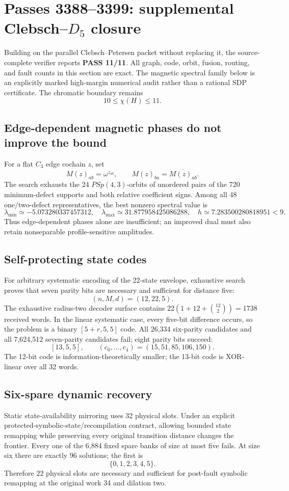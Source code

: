 \section{Passes 3388--3399: supplemental Clebsch--\(D_5\) closure}
\label{sec:bt3388-3399-clebsch-d5}

Building on the parallel Clebsch--Petersen packet without replacing it, the source-complete verifier reports \textbf{PASS 11/11}.  All graph, code,
orbit, fusion, routing, and fault counts in this section are exact.  The magnetic
spectral family below is an explicitly marked high-margin numerical audit rather
than a rational SDP certificate.  The chromatic boundary remains
\[
  \boxed{10\leq\chi(H)\leq 11}.
\]

\subsection{Edge-dependent magnetic phases do not improve the bound}
For a flat \(C_3\) edge cochain \(z\), set
\[
 M(z)_{ab}=\omega^{z_{ab}},\qquad M(z)_{ba}=\overline{M(z)_{ab}}.
\]
The search exhausts the 24 \(PSp(4,3)\)-orbits of unordered pairs of the
720 minimum-defect supports and both relative coefficient signs.  Among all
48 one/two-defect representatives, the best nonzero spectral value is
\[
 \lambda_{\min}\simeq-5.073280337457312,
 \quad \lambda_{\max}\simeq31.877958425086288,
 \quad h\simeq7.283500280818951<9.
\]
Thus edge-dependent phases alone are insufficient; an improved dual must also
retain nonseparable profile-sensitive amplitudes.

\subsection{Self-protecting state codes}
For arbitrary systematic encoding of the 22-state envelope, exhaustive search
proves that seven parity bits are necessary and sufficient for distance five:
\[
 \boxed{(n,M,d)=(12,22,5)}.
\]
The exhaustive radius-two decoder surface contains
\(22(1+12+\binom{12}{2})=1738\) received words.  In the linear systematic
case, every five-bit difference occurs, so the problem is a binary
\([5+r,5,5]\) code.  All 26,334 six-parity candidates and all 7,624,512
seven-parity candidates fail; eight parity bits succeed:
\[
 \boxed{[13,5,5]},
 \qquad (c_0,\ldots,c_4)=(15,51,85,106,150).
\]
The 12-bit code is information-theoretically smaller; the 13-bit code is
XOR-linear over all 32 words.

\subsection{Six-spare dynamic recovery}
Static state-availability mirroring uses 32 physical slots.  Under an explicit protected-symbolic-state/recompilation contract, allowing bounded state remapping while
preserving every original transition distance changes the frontier.  Every one
of the 6,884 fixed spare banks of size at most five fails.  At size six there
are exactly 96 solutions; the first is
\[
 \boxed{\{0,1,2,3,4,5\}}.
\]
Therefore 22 physical slots are necessary and sufficient for post-fault symbolic remapping at the original work 34 and dilation two.

